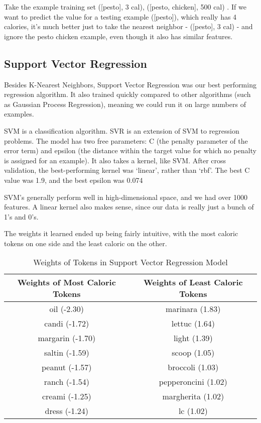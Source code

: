 \documentclass{article}
\begin{document}
Take the example training set { ([pesto], 3 cal), ([pesto, chicken], 500 cal) }. If we want to predict the value for a testing example ([pesto]), which really has 4 calories, it’s much better just to take the nearest neighbor - ([pesto], 3 cal) - and ignore the pesto chicken example, even though it also has similar features.

\subsection{Support Vector Regression}
Besides K-Nearest Neighbors, Support Vector Regression was our best performing regression algorithm. It also trained quickly compared to other algorithms (such as Gaussian Process Regression), meaning we could run it on large numbers of examples.

SVM is a classification algorithm. SVR is an extension of SVM to regression problems\cite{svm}. The model has two free parameters: C (the penalty parameter of the error term) and epsilon (the distance within the target value for which no penalty is assigned for an example). It also takes a kernel, like SVM. After cross validation, the best-performing kernel was ‘linear’, rather than ‘rbf’. The best C value was 1.9, and the best epsilon was 0.074

SVM’s generally perform well in high-dimensional space, and we had over 1000 features. A linear kernel also makes sense, since our data is really just a bunch of 1’s and 0’s.

The weights it learned ended up being fairly intuitive, with the most caloric tokens on one side and the least caloric on the other.

\begin{table}[ht]
\caption{Weights of Tokens in Support Vector Regression Model} %
\centering %
\begin{tabular}{c c} %
\hline\hline %
Weights of Most Caloric Tokens & Weights of Least Caloric Tokens \\ [0.5ex] %
\hline %
oil (-2.30) & marinara (1.83) \\
candi (-1.72) & lettuc (1.64) \\
margarin (-1.70) & light (1.39) \\
saltin (-1.59) & scoop (1.05) \\
peanut (-1.57) & broccoli (1.03) \\
ranch (-1.54) & pepperoncini (1.02) \\
creami (-1.25) & margherita (1.02) \\
dress (-1.24) & lc (1.02) \\ [1ex] %
\hline %
\end{tabular}
\label{table:nonlin} %
\end{table}
\end{document}
